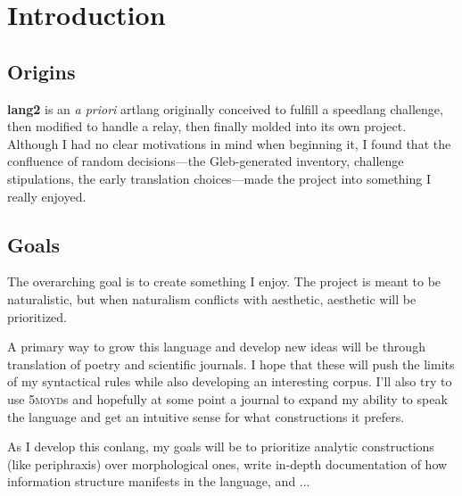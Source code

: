 \documentclass[fontsize=12pt,twoside=false,numbers=noenddot]{kaobook}
\title[A Grammar of \langname{}]{\huge \langname{}}
\subtitle{grammar of a constructed language}
\author[kilenc]{\large Seth Thompson \\ \small \textit{aka} kilenc}
\date{\small \today}
\newcommand{\langname}{\textbf{lang2}}
\newcommand{\gsc}[1]{\textsc{#1}}
\begin{document}
\frontmatter %

\maketitle
{}

\setlength{\textheight}{23cm} %
\etocstandarddisplaystyle %
\etocstandardlines %

\tableofcontents %


\setchapterpreamble[u]{\margintoc}
\chapter{Introduction}
\section{Origins}
\langname{} is an \emph{a priori} artlang originally conceived to fulfill a speedlang challenge, then modified to handle a relay, then finally molded into its own project. Although I had no clear motivations in mind when beginning it, I found that the confluence of random decisions---the Gleb-generated inventory, challenge stipulations, the early translation choices---made the project into something I really enjoyed.

\section{Goals}
The overarching goal is to create something I enjoy. The project is meant to be naturalistic, but when naturalism conflicts with aesthetic, aesthetic will be prioritized.

A primary way to grow this language and develop new ideas will be through translation of poetry and scientific journals. I hope that these will push the limits of my syntactical rules while also developing an interesting corpus. I'll also try to use \gsc{5moyd}s and hopefully at some point a journal to expand my ability to speak the language and get an intuitive sense for what constructions it prefers.

As I develop this conlang, my goals will be to prioritize analytic constructions (like periphraxis) over morphological ones, write in-depth documentation of how information structure manifests in the language, and ...
\end{document}
